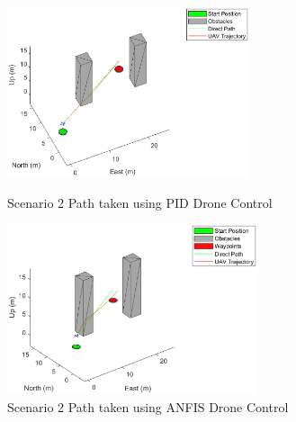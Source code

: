 \begin{figure}[H]
    \centering
    \begin{minipage}[b]{0.45\textwidth}
        \includegraphics[height=5cm,keepaspectratio]{img/scenario2_pid_paths.eps}
        \caption{Scenario 2 Path taken using PID Drone Control}
        \label{fig:Paths2_pid}
    \end{minipage}
    \hfill
    \begin{minipage}[b]{0.45\textwidth}
        \includegraphics[height=5cm,keepaspectratio]{img/scenario2_fis_paths.eps}
        \caption{Scenario 2 Path taken using ANFIS Drone Control}
        \label{fig:Paths2_fis}
    \end{minipage}
\end{figure}

